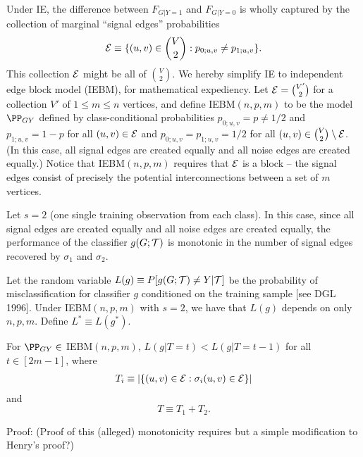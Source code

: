 Under IE,
the difference between
$F_{G|Y=1}$ and $F_{G|Y=0}$
is wholly captured by the collection of marginal ``signal edges'' probabilities
$$\mathcal{E} \equiv \{(u,v) \in {V \choose 2}: p_{0;u,v} \neq p_{1;u,v}\}.$$
This collection $\mathcal{E}$ might be all of ${V \choose 2}$.
We hereby simplify IE to independent edge block model (IEBM), for mathematical expediency.
Let $\mathcal{E} = {V' \choose 2}$ for a collection $V'$ of $1 \leq m \leq n$ vertices,
and define
IEBM$(n,p,m)$ to be the model $\PP_{GY}$ defined by class-conditional probabilities
$p_{0;u,v}=p \neq 1/2$ and $p_{1;u,v}=1-p$ for all $(u,v) \in \mathcal{E}$
and $p_{0;u,v}=p_{1;u,v}=1/2$ for all $(u,v) \in {V \choose 2} \setminus \mathcal{E}$.
(In this case, all signal edges are created equally and all noise edges are created equally.)
Notice that
IEBM$(n,p,m)$ requires that $\mathcal{E}$ is a block --
the signal edges consist of precisely the potential interconnections between a set of $m$ vertices.


Let $s=2$ (one single training observation from each class).
In this case, since all signal edges are created equally and all noise edges are created equally,
the performance of the classifier $g(G;\mathcal{T})$
is monotonic in the number of signal edges recovered by $\sigma_1$ and $\sigma_2$.


Let the random variable $L(g) \equiv P[g(G;\mathcal{T}) \neq Y| \mathcal{T}]$
be the probability of misclassification for classifier $g$
conditioned on the training sample [see DGL 1996].
Under IEBM$(n,p,m)$ with $s=2$, we have that $L(g)$ depends on only $n,p,m$.
Define $L^* \equiv L(g^*)$.

\thma
For $\PP_{GY} \in$ IEBM$(n,p,m)$,
$L(g|T=t) < L(g|T=t-1)$ for all $t \in [2m-1]$,
where
\begin{eqnarray}
T_i \equiv |\{(u,v) \in \mathcal{E}: \sigma_i(u,v) \in \mathcal{E}\}|
\end{eqnarray}
and
$$T \equiv T_1 + T_2.$$
\thmb

Proof:
(Proof of this (alleged) monotonicity requires but a simple modification to Henry's proof?)

